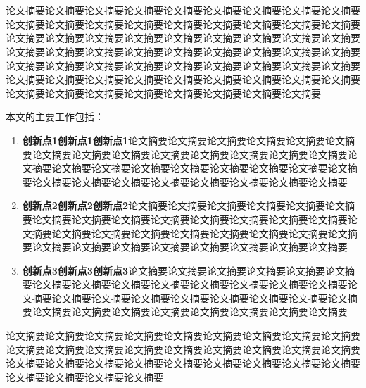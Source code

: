 \vspace{-2.5cm}
\chapter*{}

论文摘要论文摘要论文摘要论文摘要论文摘要论文摘要论文摘要论文摘要论文摘要论文摘要论文摘要论文摘要论文摘要论文摘要论文摘要论文摘要论文摘要论文摘要论文摘要论文摘要论文摘要论文摘要论文摘要论文摘要论文摘要论文摘要论文摘要论文摘要论文摘要论文摘要论文摘要论文摘要论文摘要论文摘要论文摘要论文摘要论文摘要论文摘要论文摘要论文摘要论文摘要论文摘要论文摘要论文摘要论文摘要论文摘要论文摘要论文摘要论文摘要论文摘要论文摘要论文摘要论文摘要论文摘要论文摘要论文摘要论文摘要论文摘要论文摘要论文摘要论文摘要论文摘要

本文的主要工作包括：
\begin{enumerate}
	\item
	\textbf{创新点1创新点1创新点1}论文摘要论文摘要论文摘要论文摘要论文摘要论文摘要论文摘要论文摘要论文摘要论文摘要论文摘要论文摘要论文摘要论文摘要论文摘要论文摘要论文摘要论文摘要论文摘要论文摘要论文摘要论文摘要论文摘要论文摘要论文摘要论文摘要论文摘要论文摘要论文摘要论文摘要论文摘要
	
	\item
	\textbf{创新点2创新点2创新点2}论文摘要论文摘要论文摘要论文摘要论文摘要论文摘要论文摘要论文摘要论文摘要论文摘要论文摘要论文摘要论文摘要论文摘要论文摘要论文摘要论文摘要论文摘要论文摘要论文摘要论文摘要论文摘要论文摘要论文摘要论文摘要论文摘要论文摘要论文摘要论文摘要论文摘要论文摘要
		
	\item
	\textbf{创新点3创新点3创新点3}论文摘要论文摘要论文摘要论文摘要论文摘要论文摘要论文摘要论文摘要论文摘要论文摘要论文摘要论文摘要论文摘要论文摘要论文摘要论文摘要论文摘要论文摘要论文摘要论文摘要论文摘要论文摘要论文摘要论文摘要论文摘要论文摘要论文摘要论文摘要论文摘要论文摘要论文摘要
\end{enumerate}

论文摘要论文摘要论文摘要论文摘要论文摘要论文摘要论文摘要论文摘要论文摘要论文摘要论文摘要论文摘要论文摘要论文摘要论文摘要论文摘要论文摘要论文摘要论文摘要论文摘要论文摘要论文摘要论文摘要论文摘要论文摘要论文摘要论文摘要论文摘要论文摘要论文摘要论文摘要

\hspace{-0.5cm}
 
